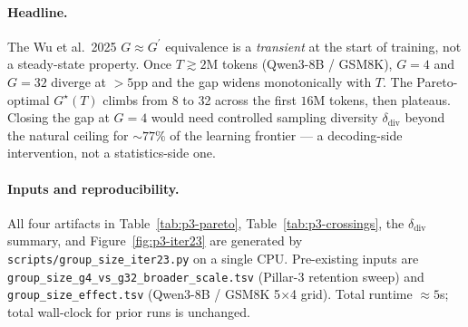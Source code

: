 \paragraph{Headline.}
The Wu et al.\ 2025 $G\!\approx\!G^\prime$ equivalence is a
\emph{transient} at the start of training, not a steady-state
property. Once $T \gtrsim 2$M tokens (Qwen3-8B / GSM8K), $G\!=\!4$ and
$G\!=\!32$ diverge at $>5$pp and the gap widens monotonically with $T$.
The Pareto-optimal $G^\star(T)$ climbs from 8 to 32 across the first
$16$M tokens, then plateaus.  Closing the gap at $G\!=\!4$ would need
controlled sampling diversity $\delta_\text{div}$ beyond the natural ceiling
for $\sim\!77\%$ of the learning frontier — a decoding-side intervention,
not a statistics-side one.

\paragraph{Inputs and reproducibility.}
All four artifacts in Table~\ref{tab:p3-pareto}, Table~\ref{tab:p3-crossings},
the $\delta_\text{div}$ summary, and Figure~\ref{fig:p3-iter23} are generated by
\texttt{scripts/group\_size\_iter23.py} on a single CPU.  Pre-existing inputs are
\texttt{group\_size\_g4\_vs\_g32\_broader\_scale.tsv} (Pillar-3 retention sweep)
and \texttt{group\_size\_effect.tsv} (Qwen3-8B / GSM8K 5$\times$4 grid).
Total runtime $\!\approx\!5$s; total wall-clock for prior runs is unchanged.
